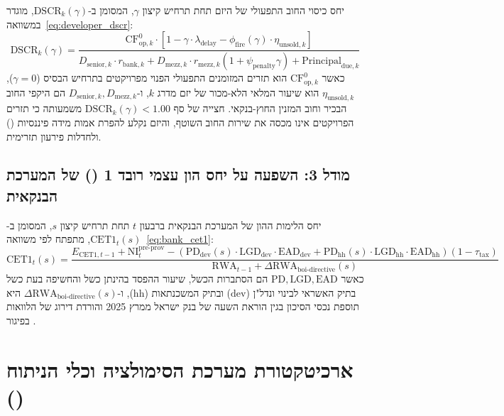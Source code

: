 יחס כיסוי החוב התפעולי של היזם תחת תרחיש קיצון $\gamma$, המסומן ב-$\text{DSCR}_k(\gamma)$, מוגדר במשוואה~\eqref{eq:developer_dscr}:
\begin{equation}
\label{eq:developer_dscr}
\text{DSCR}_k\left(\gamma\right) = \frac{\text{CF}_{\text{op},k}^{0} \cdot \left[1 - \gamma\cdot\lambda_{\text{delay}} - \phi_{\text{fire}}\left(\gamma\right)\cdot\eta_{\text{unsold},k}\right]}{D_{\text{senior},k}\cdot r_{\text{bank},k} + D_{\text{mezz},k}\cdot r_{\text{mezz},k}\left(1 + \psi_{\text{penalty}}\gamma\right) + \text{Principal}_{\text{due},k}}
\end{equation}
כאשר $\text{CF}_{\text{op},k}^{0}$ הוא תזרים המזומנים התפעולי הפנוי מפרויקטים בתרחיש הבסיס ($\gamma=0$), $\eta_{\text{unsold},k}$ הוא שיעור המלאי הלא-מכור של יזם מדרג $k$, ו-$D_{\text{senior},k}, D_{\text{mezz},k}$ הם היקפי החוב הבכיר וחוב המזנין החוץ-בנקאי. חצייה של סף $\text{DSCR}_k(\gamma) < 1.00$ משמעותה כי תזרים הפרויקטים אינו מכסה את שירות החוב השוטף, והיזם נקלע להפרת אמות מידה פיננסיות () ולחדלות פירעון תזרימית.

\subsection{מודל 3: השפעה על יחס הון עצמי רובד \num{1} () של המערכת הבנקאית}
יחס הלימות ההון  של המערכת הבנקאית ברבעון $t$ תחת תרחיש קיצון $s$, המסומן ב-$\text{CET1}_{t}(s)$, מתפתח לפי משוואה~\eqref{eq:bank_cet1}:
\begin{equation}
\label{eq:bank_cet1}
\text{CET1}_{t}\left(s\right) = \frac{E_{\text{CET1},t-1} + \text{NI}_{t}^{\text{pre-prov}} - \left(\text{PD}_{\text{dev}}(s)\cdot\text{LGD}_{\text{dev}}\cdot\text{EAD}_{\text{dev}} + \text{PD}_{\text{hh}}(s)\cdot\text{LGD}_{\text{hh}}\cdot\text{EAD}_{\text{hh}}\right)\left(1 - \tau_{\text{tax}}\right)}{\text{RWA}_{t-1} + \Delta\text{RWA}_{\text{boi-directive}}\left(s\right)}
\end{equation}
כאשר $\text{PD}, \text{LGD}, \text{EAD}$ הם הסתברות הכשל, שיעור ההפסד בהינתן כשל והחשיפה בעת כשל בתיק האשראי לבינוי ונדל"ן ($\text{dev}$) ובתיק המשכנתאות ($\text{hh}$), ו-$\Delta\text{RWA}_{\text{boi-directive}}(s)$ היא תוספת נכסי הסיכון בגין הוראת השעה של בנק ישראל ממרץ \num{2025} והורדת דירוג של הלוואות בפיגור \cite{boi2025directive}.

\section{ארכיטקטורת מערכת הסימולציה וכלי הניתוח ()}
\label{sec:system_architecture}

